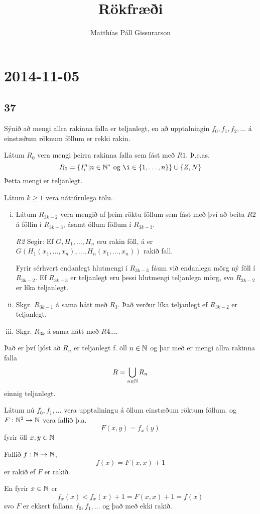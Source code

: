 \documentclass[12pt]{book}
\title{Rökfræði}
\author{Matthías Páll Gissurarson}
\newcommand{\xxn}{x_1, \dotsc, x_n}
\begin{document}
\maketitle


\chapter{2014-11-05}

\section{37}

\begin{daemi}
  Sýnið að mengi allra rakinna falla er teljanlegt, en að upptalningin
  $f_0,f_1,f_2, \dotsc$ á einstæðum röknum föllum er rekki rakin.

  \begin{lausn}
    Látum $R_0$ vera mengi þeirra rakinna falla sem fást með $R1$.
    Þ.e.as.
    \[ R_0 = \set{I_i^n | n \in \N^{*} \Og \i \in \set{1, \dotsc, n}} \cup \set{Z,N} \]
    Þetta mengi er teljanlegt.

    Látum $k \geq 1$ vera náttúrulega tölu.
    \begin{enumerate}[(i)]
    \item  Látum $R_{3k-2}$ vera mengið af þeim röktu föllum sem fást með því að 
      beita $R2$ á föllin í $R_{3k-3}$, ásamt öllum föllum í
      $R_{3k-3}$.

      \emph{R2} Segir: Ef $G,H_1, \dotsc, H_n$ eru rakin föll,
      á er $G(H_1(\xxn), \dotsc, H_n(\xxn))$ rakið fall.

      Fyrir sérhvert endanlegt hlutmengi í $R_{3k-3}$
      fáum við endanlega mörg ný föll í $R_{3k-2}$.
      Ef $R_{3k-3}$ er teljanlegt eru þessi hlutmengi teljanlega mörg,
      svo $R_{3k-2}$ er líka teljanlegt.
    \item Skgr. $R_{3k-1}$ á sama hátt með $R_3$. Það verður líka
      teljanlegt ef $R_{3k-2}$ er teljanlegt.
    \item Skgr. $R_{3k}$ á sama hátt með $R4$....
    \end{enumerate}
    Það er því ljóst að $R_n$ er teljanlegt f. öll $n \in \mathbb{N}$
    og þar með er mengi allra rakinna falla
    \[ R = \bigcup_{n \in \mathbb{N}} R_n \] 
    einnig teljanlegt.


    Látum nú $f_0, f_1, \dotsc$ vera upptaliningu á öllum einstæðum röktum föllum.
    og $F: \mathbb{N}^2 \to \mathbb{N}$ vera fallið þ.a.
    \[ F(x,y) = f_x(y) \] fyrir öll $x,y \in \mathbb{N}$

    Fallið $f: \mathbb{N} \to \mathbb{N} $,
    \[ f(x) = F(x,x) + 1 \]
    er rakið ef $F$ er rakið.

    En fyrir $x \in \mathbb{N}$ er
    \[ f_x(x) < f_x(x)+1 = F(x,x) +1 = f(x) \]
    svo $F$ er ekkert fallana $f_0, f_1, \dotsc$
    og það með ekki rakið.
  \end{lausn}
\end{daemi}
\end{document}
